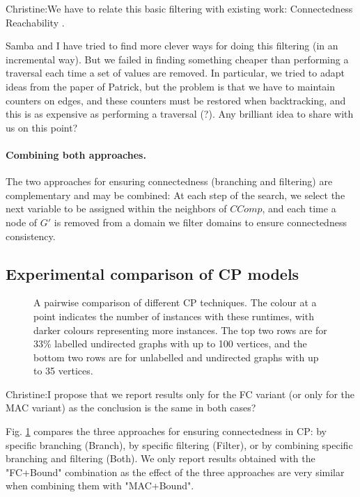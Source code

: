 \documentclass{llncs}
\newcommand{\christine}[1]{{\color{green} Christine:#1}}
\begin{document}
\christine{We have to relate this basic filtering with existing work: Connectedness \cite{Brown:2005} Reachability \cite{DBLP:conf/cp/DoomsDD05,DBLP:conf/cp/QuesadaRD05}. 

Samba and I have tried to find more clever ways for doing this filtering (in an incremental way). But we failed in finding something cheaper than performing a traversal each time a set of values are removed. In particular, we tried to adapt ideas from the paper of Patrick, but the problem is that we have to maintain counters on edges, and these counters must be restored when backtracking, and this is as expensive as performing a traversal (?). Any brilliant idea to share with us on this point?}

\paragraph{Combining both approaches.} The two approaches for ensuring connectedness (branching and filtering) are complementary and may be combined: At each step of the search, we select the next variable to be assigned within the neighbors of $CComp$, and each time a node of $G'$ is removed from a domain we filter domains to ensure connectedness consistency.


\subsection{ Experimental comparison of CP models}\label{mccs-cp-eval}


\begin{figure}[p]
    \centering
    
    \caption{A pairwise comparison of different CP techniques. The colour at a point indicates the
    number of instances with these runtimes, with darker colours representing more instances. The
    top two rows are for 33\% labelled undirected graphs with up to 100 vertices, and the bottom two
    rows are for unlabelled and undirected graphs with up to 35 vertices.}
        \label{figure:connected-cp}
\end{figure}

\christine{I propose that we report results only for the FC variant (or only for the MAC variant) as the conclusion is the same in both cases?}

Fig. \ref{figure:connected-cp} compares the three approaches for ensuring connectedness in CP: by specific branching (Branch), by specific filtering (Filter), or by combining specific branching and filtering (Both). We only report results obtained with the "FC+Bound" combination as the effect of the three approaches are very similar when combining them with "MAC+Bound".
\end{document}
